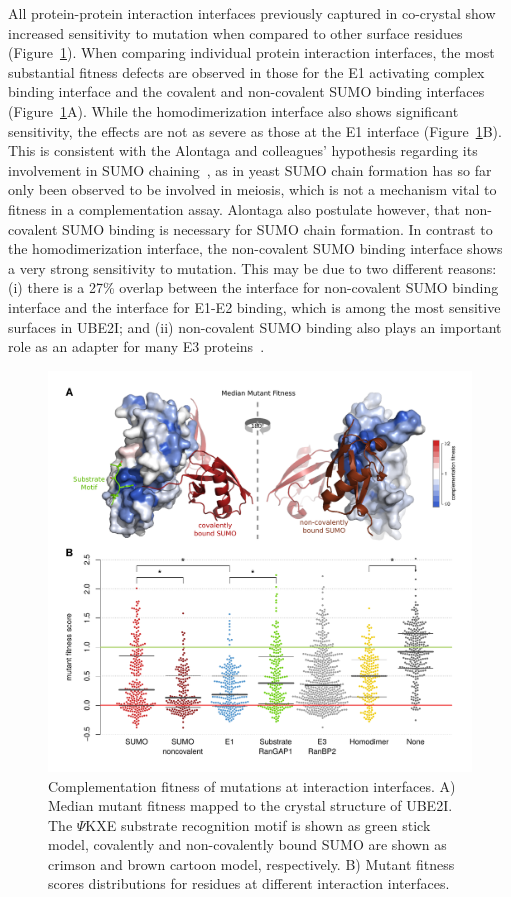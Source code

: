 All protein-protein interaction interfaces previously captured in co-crystal show increased sensitivity to mutation when compared to other surface residues (Figure~\ref{fig:ube2i_interfaces}). When comparing individual protein interaction interfaces, the most substantial fitness defects are observed in those for the E1 activating complex binding interface and the covalent and non-covalent SUMO binding interfaces (Figure~\ref{fig:ube2i_interfaces}A). While the homodimerization interface also shows significant sensitivity, the effects are not as severe as those at the E1 interface (Figure~\ref{fig:ube2i_interfaces}B). This is consistent with the Alontaga and colleagues' hypothesis regarding its involvement in SUMO chaining~\cite{alontaga_rwd_2015}, as in yeast SUMO chain formation has so far only been observed to be involved in meiosis, which is not a mechanism vital to fitness in a complementation assay. Alontaga \etal also postulate however, that non-covalent SUMO binding is necessary for SUMO chain formation. In contrast to the homodimerization interface, the non-covalent SUMO binding interface shows a very strong sensitivity to mutation. This may be due to two different reasons: (i) there is a 27\% overlap between the interface for non-covalent SUMO binding interface and the interface for E1-E2 binding, which is among the most sensitive surfaces in UBE2I; and (ii) non-covalent SUMO binding also plays an important role as an adapter for many E3 proteins~\cite{cappadocia_structural_2015}.


\begin{figure}[h!]
	\centering
	\includegraphics[width=\textwidth]{img/ube2i_interfaces.pdf}
	\caption{Complementation fitness of mutations at interaction interfaces. A) Median mutant fitness mapped to the crystal structure of UBE2I. The $\Psi$KXE substrate recognition motif is shown as green stick model, covalently and non-covalently bound SUMO are shown as crimson and brown cartoon model, respectively. B) Mutant fitness scores distributions for residues at different interaction interfaces. }
	\label{fig:ube2i_interfaces}
\end{figure}

